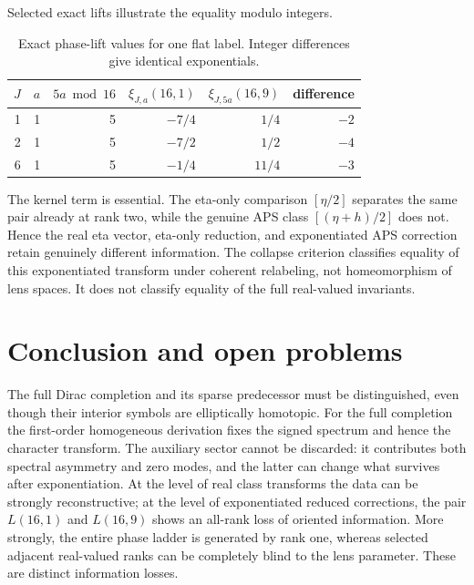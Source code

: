 \documentclass[11pt]{article}
\theoremstyle{definition}
\newcommand{\etaInv}{\eta}
\begin{document}


Selected exact lifts illustrate the equality modulo integers.
\begin{table}[ht]
\centering
\small
\begin{tabular}{@{}rrrrrr@{}}
\toprule
$J$ & $a$ & $5a\bmod16$ & $\xi_{J,a}(16,1)$ &
$\xi_{J,5a}(16,9)$ & difference\\
\midrule
1 & 1 & 5 & $-7/4$  & $1/4$ & $-2$\\
2 & 1 & 5 & $-7/2$ & $1/2$ & $-4$\\
6 & 1 & 5 & $-1/4$ & $11/4$ & $-3$\\
\bottomrule
\end{tabular}
\caption{Exact phase-lift values for one flat label.  Integer differences
give identical exponentials.}
\label{tab:phase-values}
\end{table}

The kernel term is essential.  The eta-only comparison $[\etaInv/2]$
separates the same pair already at rank two, while the genuine APS class
$[(\etaInv+h)/2]$ does not.  Hence the real eta vector, eta-only reduction,
and exponentiated APS correction retain genuinely different information.
The collapse criterion classifies equality of this exponentiated transform
under coherent relabeling, not homeomorphism of lens spaces.  It does not
classify equality of the full real-valued invariants.

\section{Conclusion and open problems}

The full Dirac completion and its sparse predecessor must be distinguished,
even though their interior symbols are elliptically homotopic. For the
full completion the first-order homogeneous derivation fixes the signed
spectrum and hence the character transform. The auxiliary sector cannot be
discarded: it contributes both
spectral asymmetry and zero modes, and the latter can change what survives
after exponentiation.  At the level of real class transforms the data can be
strongly reconstructive; at the level of exponentiated reduced corrections,
the pair $L(16,1)$ and $L(16,9)$ shows an all-rank loss of oriented
information.  More strongly, the entire phase ladder is generated by rank
one, whereas selected adjacent real-valued ranks can be completely blind to
the lens parameter.  These are distinct information losses.
\end{document}
